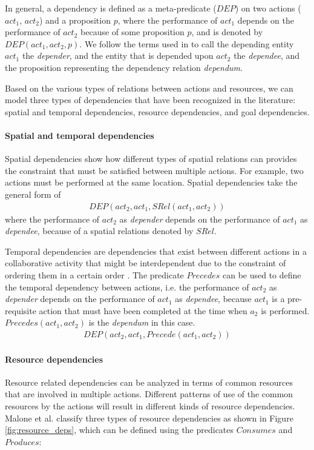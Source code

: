 In general, a dependency is defined as a meta-predicate ($DEP$) on two actions ($act_1$, $act_2$) and a proposition $p$, where the performance of $act_1$ depends on the performance of $act_2$ because of some proposition $p$, and is denoted by $DEP(act_1, act_2, p)$. We follow the terms used in \cite{yu1993actor} to call the depending entity $act_1$ the \emph{depender}, and the entity that is depended upon $act_2$ the \emph{dependee}, and the proposition representing the dependency relation \emph{dependum}.

Based on the various types of relations between actions and resources, we can model three types of dependencies that have been recognized in the literature: spatial and temporal dependencies, resource dependencies, and goal dependencies.

\paragraph*{Spatial and temporal dependencies} %
\label{par:temporal_dependencies}
Spatial dependencies show how different types of spatial relations can provides the constraint that must be satisfied between multiple actions. For example, two actions must be performed at the same location. Spatial dependencies take the general form of 
\begin{align*} 
	DEP(act_2, act_1, SRel(act_1, act_2))
\end{align*}
where the performance of $act_2$ as \emph{depender} depends on the performance of $act_1$ as \emph{dependee}, because of a spatial relations denoted by $SRel$.

Temporal dependencies are dependencies that exist between different actions in a collaborative activity that might be interdependent due to the constraint of ordering them in a certain order \cite{sikora1998a}. The predicate $Precedes$ can be used to define the temporal dependency between actions, i.e. the performance of $act_2$ as \emph{depender} depends on the performance of $act_1$ as \emph{dependee}, because $act_1$ is a pre-requisite action that must have been completed at the time when $a_2$ is performed. $Precedes(act_1, act_2)$ is the \emph{dependum} in this case.
\begin{align*} 
	 DEP(act_2, act_1, Precede(act_1, act_2))
\end{align*}

\paragraph*{Resource dependencies} %
\label{par:resource_dependencies}
Resource related dependencies can be analyzed in terms of common resources that are involved in multiple actions. Different patterns of use of the common resources by the actions will result in different kinds of resource dependencies. Malone et al. \cite{malone1994interdisciplinary} classify three types of resource dependencies as shown in Figure \ref{fig:resource_deps}, which can be defined using the predicates $Consumes$ and $Produces$:

